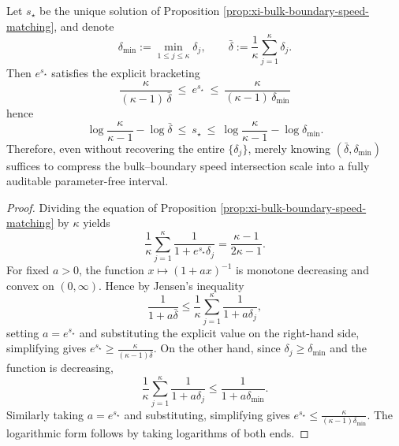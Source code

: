 \begin{corollary}\label{cor:xi-bulk-boundary-speed-matching-scale-bracketing}
Let \(s_\star\) be the unique solution of Proposition \ref{prop:xi-bulk-boundary-speed-matching}, and denote
\[
\delta_{\min}:=\min_{1\le j\le\kappa}\delta_j,
\qquad
\bar\delta:=\frac{1}{\kappa}\sum_{j=1}^{\kappa}\delta_j.
\]
Then \(e^{s_\star}\) satisfies the explicit bracketing
\[
\boxed{\;
\frac{\kappa}{(\kappa-1)\,\bar\delta}\ \le\ e^{s_\star}\ \le\ \frac{\kappa}{(\kappa-1)\,\delta_{\min}}\;}
\]
hence
\[
\log\frac{\kappa}{\kappa-1}-\log\bar\delta\ \le\ s_\star\ \le\ \log\frac{\kappa}{\kappa-1}-\log\delta_{\min}.
\]
Therefore, even without recovering the entire \(\{\delta_j\}\), merely knowing \((\bar\delta,\delta_{\min})\) suffices to compress the bulk--boundary speed intersection scale into a fully auditable parameter-free interval.
\end{corollary}
\begin{proof}
Dividing the equation of Proposition \ref{prop:xi-bulk-boundary-speed-matching} by \(\kappa\) yields
\[
\frac{1}{\kappa}\sum_{j=1}^{\kappa}\frac{1}{1+e^{s_\star}\delta_j}=\frac{\kappa-1}{2\kappa-1}.
\]
For fixed \(a>0\), the function \(x\mapsto (1+ax)^{-1}\) is monotone decreasing and convex on \((0,\infty)\).
Hence by Jensen's inequality
\[
\frac{1}{1+a\bar\delta}\le \frac{1}{\kappa}\sum_{j=1}^{\kappa}\frac{1}{1+a\delta_j},
\]
setting \(a=e^{s_\star}\) and substituting the explicit value on the right-hand side, simplifying gives
\(
e^{s_\star}\ge \frac{\kappa}{(\kappa-1)\bar\delta}
\).
On the other hand, since \(\delta_j\ge \delta_{\min}\) and the function is decreasing,
\[
\frac{1}{\kappa}\sum_{j=1}^{\kappa}\frac{1}{1+a\delta_j}\le \frac{1}{1+a\delta_{\min}}.
\]
Similarly taking \(a=e^{s_\star}\) and substituting, simplifying gives
\(
e^{s_\star}\le \frac{\kappa}{(\kappa-1)\delta_{\min}}
\).
The logarithmic form follows by taking logarithms of both ends.
\end{proof}

